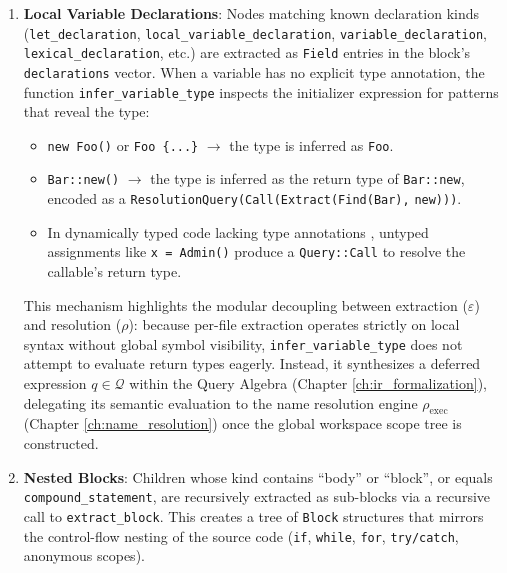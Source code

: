 \begin{enumerate}
  \item \textbf{Local Variable Declarations}: Nodes matching known
    declaration kinds (\texttt{let\_declaration},
      \texttt{local\_variable\_declaration},
      \texttt{variable\_declara}\-\texttt{tion}, \texttt{lexical\_declaration},
    etc.) are extracted as \texttt{Field} entries in the block's
    \texttt{declarations} vector. When a variable has no explicit
    type annotation, the function \texttt{infer\_variable\_type}
    inspects the initializer expression for patterns that reveal the type:
    \begin{itemize}
      \item \texttt{new Foo()} or \texttt{Foo \{...\}} $\to$ the type
        is inferred as \texttt{Foo}.
      \item \texttt{Bar::new()} $\to$ the type is inferred as the
        return type of \texttt{Bar::new}, encoded as a
        \texttt{ResolutionQuery(Call(Extract(Find(Bar),} \texttt{new)))}.
      \item In dynamically typed code lacking type annotations \cite{pep484},
        untyped assignments like \texttt{x = Admin()} produce a
        \texttt{Query::Call} to resolve the callable's return type.
    \end{itemize}

    This mechanism highlights the modular decoupling between
    extraction ($\varepsilon$)
    and resolution ($\rho$): because per-file extraction operates
    strictly on local
    syntax without global symbol visibility,
    \texttt{infer\_variable\_type} does not
    attempt to evaluate return types eagerly. Instead, it synthesizes a deferred
    expression $q \in \mathcal{Q}$ within the Query Algebra (Chapter
    \ref{ch:ir_formalization}),
    delegating its semantic evaluation to the name resolution engine
    $\rho_{\text{exec}}$
    (Chapter \ref{ch:name_resolution}) once the global workspace
    scope tree is constructed.

  \item \textbf{Nested Blocks}: Children whose kind contains ``body''
    or ``block'', or equals \texttt{compound\_statement}, are
    recursively extracted as sub-blocks via a recursive call to
    \texttt{extract\_block}. This creates a tree of \texttt{Block}
    structures that mirrors the control-flow nesting of the source
    code (\texttt{if}, \texttt{while}, \texttt{for},
    \texttt{try/catch}, anonymous scopes).


\end{enumerate}

